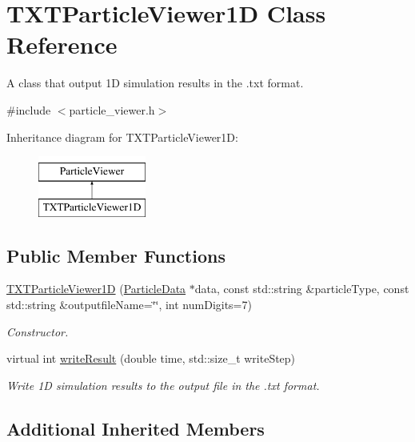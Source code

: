 \hypertarget{classTXTParticleViewer1D}{\section{T\-X\-T\-Particle\-Viewer1\-D Class Reference}
\label{classTXTParticleViewer1D}
}


A class that output 1\-D simulation results in the .txt format.  




{\ttfamily \#include $<$particle\-\_\-viewer.\-h$>$}

Inheritance diagram for T\-X\-T\-Particle\-Viewer1\-D\-:\begin{figure}[H]
\begin{center}
\leavevmode
\includegraphics[height=2.000000cm]{classTXTParticleViewer1D}
\end{center}
\end{figure}
\subsection*{Public Member Functions}
\begin{DoxyCompactItemize}
\item 
\hyperlink{classTXTParticleViewer1D_aba328b61f24b58d0a43ea98a2c54401d}{T\-X\-T\-Particle\-Viewer1\-D} (\hyperlink{classParticleData}{Particle\-Data} $\ast$data, const std\-::string \&particle\-Type, const std\-::string \&outputfile\-Name=\char`\"{}\char`\"{}, int num\-Digits=7)
\begin{DoxyCompactList}\small\item\em Constructor. \end{DoxyCompactList}\item 
virtual int \hyperlink{classTXTParticleViewer1D_a7635e39575c87b9679fd163d45fc4b4a}{write\-Result} (double time, std\-::size\-\_\-t write\-Step)
\begin{DoxyCompactList}\small\item\em Write 1\-D simulation results to the output file in the .txt format. \end{DoxyCompactList}\end{DoxyCompactItemize}
\subsection*{Additional Inherited Members}


